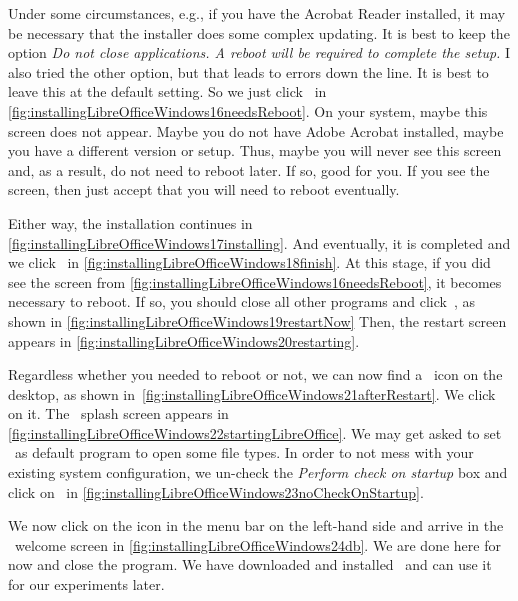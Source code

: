 Under some circumstances, e.g., if you have the Acrobat Reader installed, it may be necessary that the installer does some complex updating.
It is best to keep the option \emph{Do not close applications. A reboot will be required to complete the setup.}
I also tried the other option, but that leads to errors down the line.
It is best to leave this at the default setting.
So we just click~ in \cref{fig:installingLibreOfficeWindows16needsReboot}.
On your system, maybe this screen does not appear.
Maybe you do not have Adobe Acrobat installed, maybe you have a different version or setup.
Thus, maybe you will never see this screen and, as a result, do not need to reboot later.
If so, good for you.
If you see the screen, then just accept that you will need to reboot eventually.

Either way, the installation continues in \cref{fig:installingLibreOfficeWindows17installing}.
And eventually, it is completed and we click~ in \cref{fig:installingLibreOfficeWindows18finish}.
At this stage, if you did see the screen from \cref{fig:installingLibreOfficeWindows16needsReboot}, it becomes necessary to reboot.
If so, you should close all other programs and click~, as shown in \cref{fig:installingLibreOfficeWindows19restartNow}
Then, the restart screen appears in \cref{fig:installingLibreOfficeWindows20restarting}.

Regardless whether you needed to reboot or not, we can now find a \libreoffice\ icon on the desktop, as shown in~\cref{fig:installingLibreOfficeWindows21afterRestart}.
We click on it.
The \libreoffice\ splash screen appears in \cref{fig:installingLibreOfficeWindows22startingLibreOffice}.
We may get asked to set \libreoffice\ as default program to open some file types.
In order to not mess with your existing system configuration, we un-check the \emph{Perform check on startup} box and click on~ in \cref{fig:installingLibreOfficeWindows23noCheckOnStartup}.

We now click on the  icon in the menu bar on the left-hand side and arrive in the \libreofficeBase\ welcome screen in \cref{fig:installingLibreOfficeWindows24db}.
We are done here for now and close the program.
We have downloaded and installed \libreofficeBase\ and can use it for our experiments later.%
%
\FloatBarrier%
\endhsection%
%
